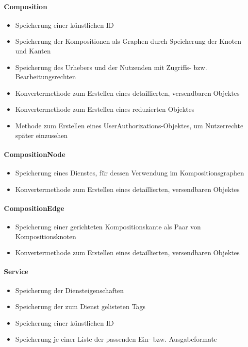 \paragraph{Composition}
\begin{itemize}
	\item Speicherung einer künstlichen ID
	\item Speicherung der Kompositionen als Graphen durch Speicherung der Knoten und Kanten
	\item Speicherung des Urhebers und der Nutzenden mit Zugriffs- bzw. Bearbeitungsrechten
	\item Konvertermethode zum Erstellen eines detaillierten, versendbaren Objektes
	\item Konvertermethode zum Erstellen eines reduzierten Objektes
	\item Methode zum Erstellen eines UserAuthorizations-Objektes, um Nutzerrechte später einzusehen
\end{itemize} 

\paragraph{CompositionNode}
\begin{itemize}
	\item Speicherung eines Dienstes, für dessen Verwendung im Kompositionsgraphen
	\item Konvertermethode zum Erstellen eines detaillierten, versendbaren Objektes
\end{itemize} 
\paragraph{CompositionEdge} 
\begin{itemize}
	\item Speicherung einer gerichteten Kompositionskante als Paar von Kompositionsknoten
	\item Konvertermethode zum Erstellen eines detaillierten, versendbaren Objektes
\end{itemize}

\paragraph{Service}
\begin{itemize}
	\item Speicherung der Diensteigenschaften
	\item Speicherung der zum Dienst gelisteten Tags
	\item Speicherung einer künstlichen ID
	\item Speicherung je einer Liste der passenden Ein- bzw. Ausgabeformate
\end{itemize} 
